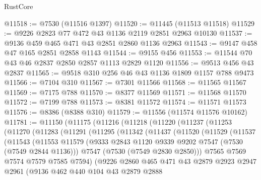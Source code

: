 \begin{lexlean}{RustCore}
\begin{coremodule}
@11518 := @7530 (@11516 @1397)
@11520 := @11445 (@11513 @11518)
@11529 := @9226 @2823 @77 @472 @43 @1136 @2119 @2851 @2963 @10130
@11537 := @9136 @459 @465 @471 @43 @2851 @2860 @1136 @2963
@11543 := @9147 @458 @47 @165 @2851 @2858 @1143
@11544 := @9155 @456
@11553 := @11544 @70 @43 @46 @2837 @2850 @2857 @1113 @2829 @1120
@11556 := @9513 @456 @43 @2837
@11565 := @9518 @310 @256 @46 @43 @1136 @1809 @1157 @788 @9473
@11566 := @7104 @310
@11567 := @7301 @11566
@11568 := @11565 @11567
@11569 := @7175 @788
@11570 := @8377 @11569
@11571 := @11568 @11570
@11572 := @7199 @788
@11573 := @8381 @11572
@11574 := @11571 @11573
@11576 := @8386 (@8388 @310)
@11579 := @11556 (@11574 @11576 @10162)
@11781 := @11150
    (@11175
      (@11216
        (@11218
          (@11220
            (@11237
              (@11253
                (@11270
                  (@11283
                    (@11291
                      (@11295
                        (@11342
                          (@11437
                            (@11520
                              (@11529
                                (@11537
                                  (@11543
                                    (@11553
                                      @11579
                                      (@9333
                                        @2843
                                        @1120
                                        @9339
                                        @9202
                                        @7547
                                        (@7530 (@7549 @2844 @1136)))
                                      @7547
                                      (@7530 (@7549 @2830 @2850)))
                                    @7565
                                    @7569
                                    @7574
                                    @7579
                                    @7585
                                    @7594)
                                  (@9226
                                    @2860
                                    @465
                                    @471
                                    @43
                                    @2879
                                    @2923
                                    @2947
                                    @2961
                                    (@9136
                                      @462
                                      @440
                                      @104
                                      @43
                                      @2879
                                      @2888

\end{coremodule}
\end{lexlean}
